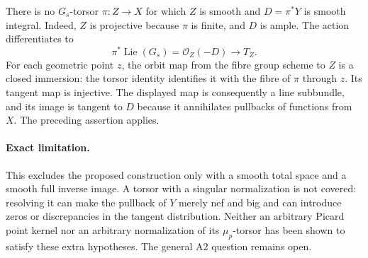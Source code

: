 There is no $G_s$-torsor $\pi:Z\to X$ for which $Z$ is smooth and
$D=\pi^*Y$ is smooth integral. Indeed, $Z$ is projective because
$\pi$ is finite, and $D$ is ample. The action differentiates to
\[
 \pi^*\operatorname{Lie}(G_s)=\mathcal O_Z(-D)\longrightarrow T_Z.
\]
For each geometric point $z$, the orbit map from the fibre group
scheme to $Z$ is a closed immersion: the torsor identity identifies
it with the fibre of $\pi$ through $z$. Its tangent map is injective.
The displayed map is consequently a line subbundle, and its image
is tangent to $D$ because it annihilates pullbacks of functions from
$X$. The preceding assertion applies.

\paragraph{Exact limitation.}
This excludes the proposed construction only with a smooth total
space and a smooth full inverse image. A torsor with a singular
normalization is not covered: resolving it can make the pullback of
$Y$ merely nef and big and can introduce zeros or discrepancies in
the tangent distribution. Neither an arbitrary Picard point kernel
nor an arbitrary normalization of its $\mu_p$-torsor has been shown
to satisfy these extra hypotheses. The general A2 question remains open.
